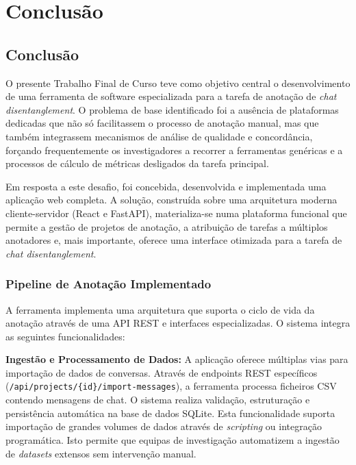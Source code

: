 \chapter{Conclusão}
\label{cha:conclusao}

\section{Conclusão}

O presente Trabalho Final de Curso teve como objetivo central o desenvolvimento de uma ferramenta de software especializada para a tarefa de anotação de \textit{chat disentanglement}. O problema de base identificado foi a ausência de plataformas dedicadas que não só facilitassem o processo de anotação manual, mas que também integrassem mecanismos de análise de qualidade e concordância, forçando frequentemente os investigadores a recorrer a ferramentas genéricas e a processos de cálculo de métricas desligados da tarefa principal.

Em resposta a este desafio, foi concebida, desenvolvida e implementada uma aplicação web completa. A solução, construída sobre uma arquitetura moderna cliente-servidor (React e FastAPI), materializa-se numa plataforma funcional que permite a gestão de projetos de anotação, a atribuição de tarefas a múltiplos anotadores e, mais importante, oferece uma interface otimizada para a tarefa de \textit{chat disentanglement}.

\subsection{Pipeline de Anotação Implementado}

A ferramenta implementa uma arquitetura que suporta o ciclo de vida da anotação através de uma API REST e interfaces especializadas. O sistema integra as seguintes funcionalidades:

\textbf{Ingestão e Processamento de Dados:} A aplicação oferece múltiplas vias para importação de dados de conversas. Através de endpoints REST específicos (\texttt{/api/projects/\{id\}/import-messages}), a ferramenta processa ficheiros CSV contendo mensagens de chat. O sistema realiza validação, estruturação e persistência automática na base de dados SQLite. Esta funcionalidade suporta importação de grandes volumes de dados através de \textit{scripting} ou integração programática. Isto permite que equipas de investigação automatizem a ingestão de \textit{datasets} extensos sem intervenção manual.

